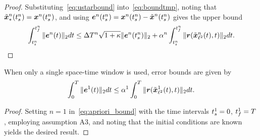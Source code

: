 \begin{proof}
Substituting~\eqref{eq:ustarbound} into~\eqref{eq:boundtmp}, noting that $\tilde{\boldsymbol x}_{*}^{n}(t_s^{n})=  {\boldsymbol x}^{n}(t_s^{n})$,  and using $\boldsymbol e^{n}(t_s^{n}) =  {\boldsymbol x}^{n}(t_s^{n} ) -  \tilde{\boldsymbol x}^{n}(t_s^{n})$ gives the upper bound
\begin{equation*}
\int_{t_s^{n}}^{t_f^{n}} \| \boldsymbol e^{n}(t) \|_2 dt \le \Delta T^{n} \sqrt{1 + \kappa} \|  \boldsymbol e^{n}(t_s^{n})   \|_2   + \alpha^{n} \int_{t_s^{n}}^{t_f^{n}} \|  \boldsymbol r(\tilde{\boldsymbol x}_{\ell^2}^{n}(t),t)  \|_2 dt.
\end{equation*}
\end{proof}

\begin{corollary}
When only a single space-time window is used, error bounds are given by
\begin{equation*}
\int_0^T \norm{\errorArgt{1}{t}} dt \le \lipshitziArg{1} \int_0^T \norm{\resid(\stateFOMProjSolArgt{1}{t},t)}dt. %
\end{equation*}
\end{corollary}
\begin{proof}
Setting $n=1$ in~\eqref{eq:apriori_bound} with the time intervals $t_s^{1}=0$, $t_f^{1}=T$, employing assumption A3, and noting that the initial conditions are known yields the desired result.
\end{proof}

